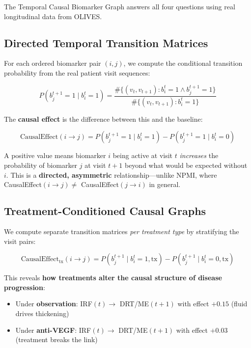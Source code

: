 \documentclass[12pt,a4paper]{article}
\begin{document}
The Temporal Causal Biomarker Graph answers all four questions using real longitudinal data from OLIVES.

\subsection{Directed Temporal Transition Matrices}

For each ordered biomarker pair $(i, j)$, we compute the conditional transition probability from the real patient visit sequences:

\begin{equation}
P(b_j^{t+1} = 1 \mid b_i^{t} = 1) = \frac{\#\{(v_t, v_{t+1}) : b_i^t = 1 \wedge b_j^{t+1} = 1\}}{\#\{(v_t, v_{t+1}) : b_i^t = 1\}}
\end{equation}

The \textbf{causal effect} is the difference between this and the baseline:

\begin{equation}
\text{CausalEffect}(i \to j) = P(b_j^{t+1} = 1 \mid b_i^{t} = 1) - P(b_j^{t+1} = 1 \mid b_i^{t} = 0)
\end{equation}

A positive value means biomarker $i$ being active at visit $t$ \emph{increases} the probability of biomarker $j$ at visit $t{+}1$ beyond what would be expected without $i$. This is a \textbf{directed, asymmetric} relationship---unlike NPMI, where CausalEffect$(i \to j) \neq$ CausalEffect$(j \to i)$ in general.

\subsection{Treatment-Conditioned Causal Graphs}

We compute separate transition matrices \emph{per treatment type} by stratifying the visit pairs:

\begin{equation}
\text{CausalEffect}_{\text{tx}}(i \to j) = P(b_j^{t+1} \mid b_i^{t} = 1, \text{tx}) - P(b_j^{t+1} \mid b_i^{t} = 0, \text{tx})
\end{equation}

This reveals \textbf{how treatments alter the causal structure of disease progression}:
\begin{itemize}[nosep]
  \item Under \textbf{observation}: IRF$(t) \to$ DRT/ME$(t{+}1)$ with effect $+0.15$ (fluid drives thickening)
  \item Under \textbf{anti-VEGF}: IRF$(t) \to$ DRT/ME$(t{+}1)$ with effect $+0.03$ (treatment breaks the link)
\end{itemize}
\end{document}
